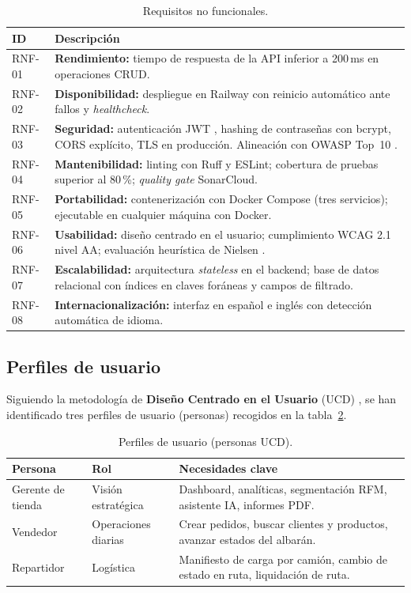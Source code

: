\documentclass[12pt,twoside,titlepage]{report}
\begin{document}
\begin{table}[H]
  \centering
  \caption{Requisitos no funcionales.}
  \label{tab:rnf}
  \begin{tabularx}{\textwidth}{lX}
    \toprule
    \textbf{ID} & \textbf{Descripción} \\
    \midrule
    RNF-01 & \textbf{Rendimiento:} tiempo de respuesta de la API inferior a 200\,ms en operaciones CRUD. \\
    RNF-02 & \textbf{Disponibilidad:} despliegue en Railway con reinicio automático ante fallos y \emph{healthcheck}. \\
    RNF-03 & \textbf{Seguridad:} autenticación JWT \cite{rfc7519}, hashing de contraseñas con bcrypt, CORS explícito, TLS en producción. Alineación con OWASP Top~10 \cite{owasp2021}. \\
    RNF-04 & \textbf{Mantenibilidad:} linting con Ruff y ESLint; cobertura de pruebas superior al 80\,\%; \emph{quality gate} SonarCloud. \\
    RNF-05 & \textbf{Portabilidad:} contenerización con Docker Compose (tres servicios); ejecutable en cualquier máquina con Docker. \\
    RNF-06 & \textbf{Usabilidad:} diseño centrado en el usuario; cumplimiento WCAG 2.1 nivel AA; evaluación heurística de Nielsen \cite{nielsen}. \\
    RNF-07 & \textbf{Escalabilidad:} arquitectura \emph{stateless} en el backend; base de datos relacional con índices en claves foráneas y campos de filtrado. \\
    RNF-08 & \textbf{Internacionalización:} interfaz en español e inglés con detección automática de idioma. \\
    \bottomrule
  \end{tabularx}
\end{table}

\subsection{Perfiles de usuario}

Siguiendo la metodología de \textbf{Diseño Centrado en el Usuario} (UCD) \cite{iso9241}, se han identificado tres perfiles de usuario (personas) recogidos en la tabla~\ref{tab:personas}.

\begin{table}[H]
  \centering
  \caption{Perfiles de usuario (personas UCD).}
  \label{tab:personas}
  \begin{tabularx}{\textwidth}{llX}
    \toprule
    \textbf{Persona} & \textbf{Rol} & \textbf{Necesidades clave} \\
    \midrule
    Gerente de tienda & Visión estratégica & Dashboard, analíticas, segmentación RFM, asistente IA, informes PDF. \\
    Vendedor & Operaciones diarias & Crear pedidos, buscar clientes y productos, avanzar estados del albarán. \\
    Repartidor & Logística & Manifiesto de carga por camión, cambio de estado en ruta, liquidación de ruta. \\
    \bottomrule
  \end{tabularx}
\end{table}
\end{document}
